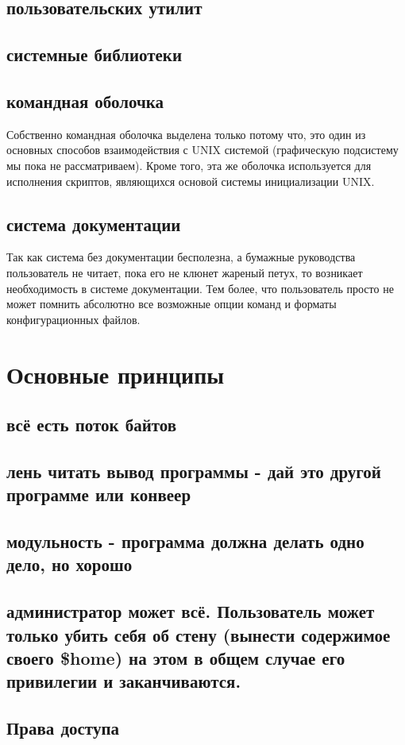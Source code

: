 \subsection{пользовательских утилит}
\subsection{системные библиотеки}
\subsection{командная оболочка}
Собственно командная оболочка выделена только потому что, это один из основных способов взаимодействия с UNIX системой (графическую подсистему мы пока не рассматриваем). Кроме того, эта же оболочка используется для исполнения скриптов, являющихся основой системы инициализации UNIX.
\subsection{система документации}
Так как система без документации бесполезна, а бумажные руководства пользователь не читает, пока его не клюнет жареный петух, то возникает необходимость в системе документации. Тем более, что пользователь просто не может помнить абсолютно все возможные опции команд и форматы конфигурационных файлов.
\section {Основные принципы}
\subsection{всё есть поток байтов}
\subsection{лень читать вывод программы - дай это другой программе или конвеер}
\subsection{модульность - программа должна делать одно дело, но хорошо}
\subsection{администратор может всё. Пользователь может только убить себя об стену (вынести содержимое своего \$home) на этом в общем случае его привилегии и заканчиваются.}
\subsection{Права доступа}
